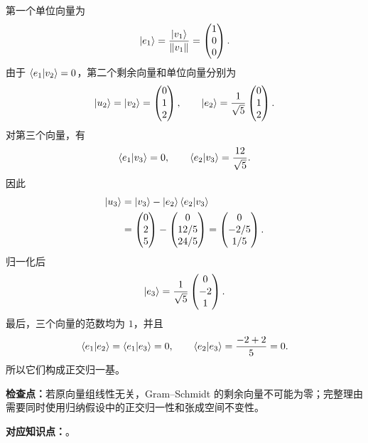 \begin{checkedsolution}
第一个单位向量为
\[
  \left|e_1\right\rangle=\frac{\left|v_1\right\rangle}{\left\lVert v_1 \right\rVert}
  =\begin{pmatrix}1\\0\\0\end{pmatrix}.
\]
由于 $\left\langle e_1 \middle| v_2 \right\rangle=0$，第二个剩余向量和单位向量分别为
\[
  \left|u_2\right\rangle=\left|v_2\right\rangle
  =\begin{pmatrix}0\\1\\2\end{pmatrix},
  \qquad
  \left|e_2\right\rangle=\frac{1}{\sqrt5}
  \begin{pmatrix}0\\1\\2\end{pmatrix}.
\]
对第三个向量，有
\[
  \left\langle e_1 \middle| v_3 \right\rangle=0,
  \qquad
  \left\langle e_2 \middle| v_3 \right\rangle=\frac{12}{\sqrt5}.
\]
因此
\begin{align*}
  \left|u_3\right\rangle
  &=\left|v_3\right\rangle-\left|e_2\right\rangle\left\langle e_2 \middle| v_3 \right\rangle\\
  &=\begin{pmatrix}0\\2\\5\end{pmatrix}
    -\begin{pmatrix}0\\12/5\\24/5\end{pmatrix}
   =\begin{pmatrix}0\\-2/5\\1/5\end{pmatrix}.
\end{align*}
归一化后
\[
  \left|e_3\right\rangle=\frac{1}{\sqrt5}
  \begin{pmatrix}0\\-2\\1\end{pmatrix}.
\]
最后，三个向量的范数均为 $1$，并且
\[
  \left\langle e_1 \middle| e_2 \right\rangle=\left\langle e_1 \middle| e_3 \right\rangle=0,
  \qquad
  \left\langle e_2 \middle| e_3 \right\rangle=\frac{-2+2}{5}=0.
\]
所以它们构成正交归一基。
\end{checkedsolution}

\textbf{检查点：}若原向量组线性无关，Gram--Schmidt 的剩余向量不可能为零；完整理由需要同时使用归纳假设中的正交归一性和张成空间不变性。


\textbf{对应知识点：}。

